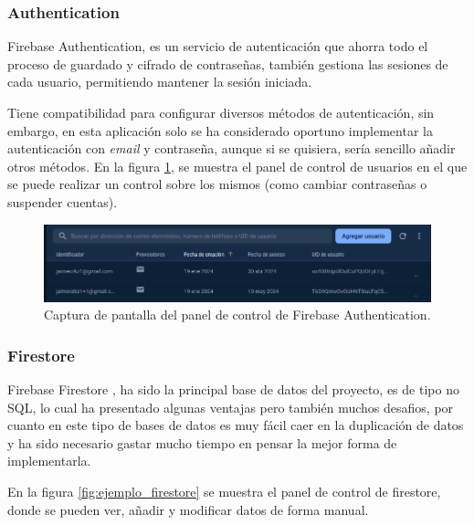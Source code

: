 \subsubsection{Authentication}
\label{subsec:firebaseAuth}
Firebase Authentication\hyperlink{cap:biblio}{}, es un servicio de autenticación que ahorra todo el proceso de guardado y cifrado de contraseñas, también gestiona las sesiones de cada usuario, permitiendo mantener la sesión iniciada. 

Tiene compatibilidad para configurar diversos métodos de autenticación, sin embargo, en esta aplicación solo se ha considerado oportuno implementar la autenticación con \textit{email} y contraseña, aunque si se quisiera, sería sencillo añadir otros métodos. En la figura \ref{fig:ejemplo_auth}, se muestra el panel de control de usuarios en el que se puede realizar un control sobre los mismos (como cambiar contraseñas o suspender cuentas).
\begin{figure}[h]
    \centering
    \includegraphics[width = 1\textwidth]{Imagenes/Fuentes/ejemplo_auth.png}
    \caption{Captura de pantalla del panel de control de Firebase Authentication.}
    \label{fig:ejemplo_auth}
\end{figure}
\hypertarget{subsec:firestore}{}
\subsubsection{Firestore} 
Firebase Firestore \hyperlink{cap:biblio}{}, ha sido la principal base de datos del proyecto, es de tipo no SQL, lo cual ha presentado algunas ventajas pero también muchos desafios, por cuanto en este tipo de bases de datos es muy fácil caer en la duplicación de datos y ha sido necesario gastar mucho tiempo en pensar la mejor forma de implementarla. 

En la figura \ref{fig:ejemplo_firestore} se muestra el panel de control de firestore, donde se pueden ver, añadir y modificar datos de forma manual. 


